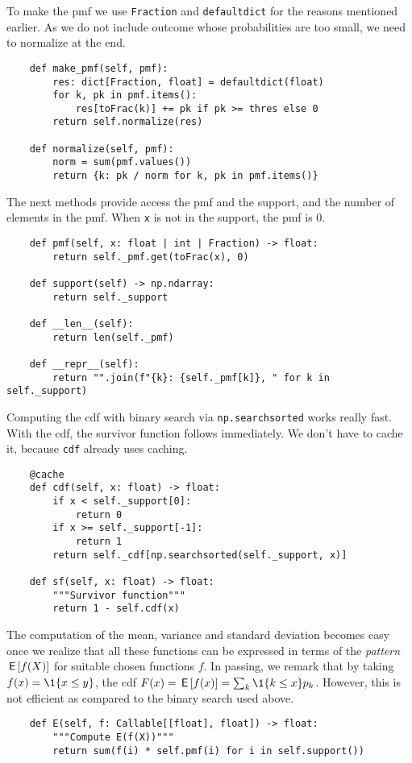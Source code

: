 \documentclass[stochastic-or]{subfiles}
\begin{document}
To make the pmf we use \texttt{Fraction} and \texttt{defaultdict} for the reasons mentioned earlier.
As we do not include outcome whose probabilities are too small, we need to normalize at the end.

\begin{verbatim}
    def make_pmf(self, pmf):
        res: dict[Fraction, float] = defaultdict(float)
        for k, pk in pmf.items():
            res[toFrac(k)] += pk if pk >= thres else 0
        return self.normalize(res)

    def normalize(self, pmf):
        norm = sum(pmf.values())
        return {k: pk / norm for k, pk in pmf.items()}
\end{verbatim}

The next methods provide access the pmf and the support, and the number of elements in the pmf.
When \texttt{x} is not in the support, the pmf is \(0\).
\begin{verbatim}
    def pmf(self, x: float | int | Fraction) -> float:
        return self._pmf.get(toFrac(x), 0)

    def support(self) -> np.ndarray:
        return self._support

    def __len__(self):
        return len(self._pmf)

    def __repr__(self):
        return "".join(f"{k}: {self._pmf[k]}, " for k in self._support)
\end{verbatim}

Computing the cdf with binary search via \texttt{np.searchsorted} works really fast.
With the cdf, the survivor function follows immediately. We don't have to cache it, because \texttt{cdf} already uses caching.
\begin{verbatim}
    @cache
    def cdf(self, x: float) -> float:
        if x < self._support[0]:
            return 0
        if x >= self._support[-1]:
            return 1
        return self._cdf[np.searchsorted(self._support, x)]

    def sf(self, x: float) -> float:
        """Survivor function"""
        return 1 - self.cdf(x)
\end{verbatim}


The computation of the mean, variance and standard deviation becomes easy once we realize that all these functions can be expressed in terms of the \emph{pattern} \(\,\mathsf{E}\left[f(X)\right]\) for suitable chosen functions \(f\).
In passing, we remark that by taking \(f(x) = \1{x\leq y}\), the cdf \(F(x) = \E{f(x)} = \sum_{k} \1{k \leq x} p_{k}\).
However, this is not efficient as compared to the binary search used above.
\begin{verbatim}
    def E(self, f: Callable[[float], float]) -> float:
        """Compute E(f(X))"""
        return sum(f(i) * self.pmf(i) for i in self.support())
\end{verbatim}
\end{document}
